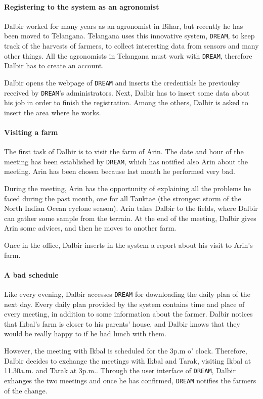 \documentclass{article}
\begin{document}
\paragraph{Registering to the system as an agronomist}
Dalbir worked for many years as an agronomist in Bihar, but recently he has been moved to Telangana. Telangana uses this innovative system, \verb|DREAM|, to keep track of the harvests of farmers, to collect interesting data from sensors and many other things. All the agronomists in Telangana must work with \verb|DREAM|, therefore Dalbir has to create an account. \par
\noindent Dalbir opens the webpage of \verb|DREAM| and inserts the credentials he previoulsy received by \verb|DREAM|'s administrators. Next, Dalbir has to insert some data about his job in order to finish the registration. Among the others, Dalbir is asked to insert the area where he works.\par
\paragraph{Visiting a farm}
The first task of Dalbir is to visit the farm of Arin. The date and hour of the meeting has been established by \verb |DREAM|, which has notified also Arin about the meeting. Arin has been chosen because last month he performed very bad.\par
\noindent During the meeting, Arin has the opportunity of explaining all the problems he faced during the past month, one for all Tauktae (the strongest storm of the North Indian Ocean cyclone season). Arin takes Dalbir to the fields, where Dalbir can gather some sample from the terrain. At the end of the meeting, Dalbir gives Arin some advices, and then he moves to another farm. \par
\noindent Once in the office, Dalbir inserts in the system a report about his visit to Arin's farm.
\paragraph{A bad schedule}
Like every evening, Dalbir accesses \verb|DREAM| for downloading the daily plan of the next day. Every daily plan provided by the system contains time and place of every meeting, in addition to some information about the farmer. Dalbir notices that Ikbal's farm is closer to his parents' house, and Dalbir knows that they would be really happy to if he had lunch with them.\par
\noindent However, the meeting with Ikbal is scheduled for the 3p.m o' clock. Therefore, Dalbir decides to exchange the meetings with Ikbal and Tarak, visiting Ikbal at 11.30a.m. and Tarak at 3p.m.. Through the user interface of \verb|DREAM|, Dalbir exhanges the two meetings and once he has confirmed, \verb|DREAM| notifies the farmers of the change.
\end{document}
